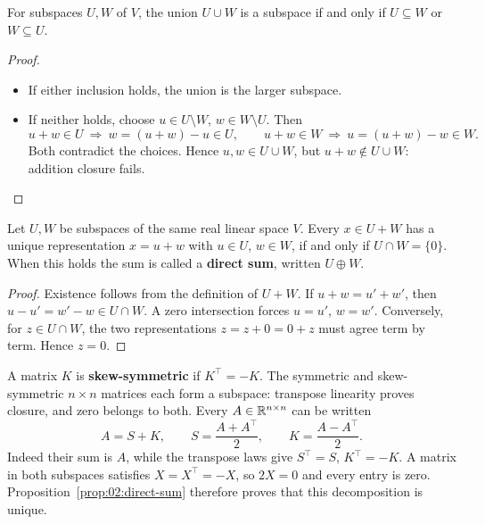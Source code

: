 \begin{proposition}\label{prop:02:union}
For subspaces \(U,W\) of \(V\), the union \(U\cup W\) is a subspace
if and only if \(U\subseteq W\) or \(W\subseteq U\).
\end{proposition}
\begin{proof}
\begin{itemize}
\item If either inclusion holds, the union is the larger subspace.
\item {}If neither holds, choose \(u\in U\setminus W\), \(w\in W\setminus U\).
Then
\[
u+w\in U\ \Longrightarrow\ w=(u+w)-u\in U,\qquad
u+w\in W\ \Longrightarrow\ u=(u+w)-w\in W.
\]
Both contradict the choices. Hence \(u,w\in U\cup W\), but
\(u+w\notin U\cup W\): addition closure fails.
\end{itemize}
\end{proof}

\begin{proposition}\label{prop:02:direct-sum}
Let \(U,W\) be subspaces of the same real linear space \(V\).
Every \(x\in U+W\) has a unique representation \(x=u+w\) with
\(u\in U\), \(w\in W\), if and only if \(U\cap W=\{0\}\).
When this holds the sum is called a \textbf{direct sum}, written \(U\oplus W\).
\end{proposition}
\begin{proof}
Existence follows from the definition of \(U+W\).
If \(u+w=u'+w'\), then \(u-u'=w'-w\in U\cap W\).
A zero intersection forces \(u=u'\), \(w=w'\).
Conversely, for \(z\in U\cap W\), the two representations
\(z=z+0=0+z\) must agree term by term. Hence \(z=0\).
\end{proof}

\begin{example}\label{example:02:decomposition}
A matrix \(K\) is \textbf{skew-symmetric} if \(K^\top=-K\).
The symmetric and skew-symmetric \(n\times n\) matrices each form a
subspace: transpose linearity proves closure, and zero belongs to both.
Every \(A\in\mathbb R^{n\times n}\) can be written
\[
A=S+K,\qquad S=\frac{A+A^\top}{2},\qquad K=\frac{A-A^\top}{2}.
\]
Indeed their sum is \(A\), while the transpose laws give
\(S^\top=S\), \(K^\top=-K\). A matrix in both subspaces satisfies
\(X=X^\top=-X\), so \(2X=0\) and every entry is zero.
Proposition~\ref{prop:02:direct-sum} therefore proves that this
decomposition is unique.
\end{example}

